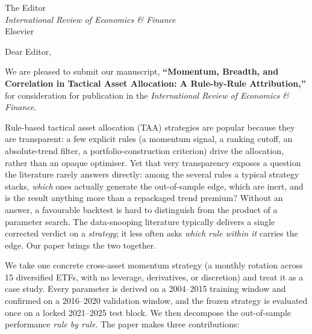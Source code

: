 \documentclass[11pt,a4paper]{letter}
\begin{document}
\begin{letter}{The Editor\\\textit{International Review of Economics \& Finance}\\Elsevier}

\opening{Dear Editor,}

\onehalfspacing

We are pleased to submit our manuscript, \textbf{``Momentum, Breadth, and
Correlation in Tactical Asset Allocation: A Rule-by-Rule Attribution,''} for
consideration for publication in the \textit{International Review of Economics \& Finance}.

Rule-based tactical asset allocation (TAA) strategies are popular because they are
transparent: a few explicit rules (a momentum signal, a ranking cutoff, an
absolute-trend filter, a portfolio-construction criterion) drive the allocation,
rather than an opaque optimiser. Yet that very transparency exposes a question the
literature rarely answers directly: among the several rules a typical strategy
stacks, \emph{which} ones actually generate the out-of-sample edge, which are
inert, and is the result anything more than a repackaged trend premium? Without an
answer, a favourable backtest is hard to distinguish from the product of a
parameter search. The data-snooping literature typically delivers a single
corrected verdict on a \emph{strategy}; it less often asks \emph{which rule within
it} carries the edge. Our paper brings the two together.

We take one concrete cross-asset momentum strategy (a monthly rotation across 15
diversified ETFs, with no leverage, derivatives, or discretion) and treat it as a
case study. Every parameter is derived on a 2004--2015 training window and confirmed
on a 2016--2020 validation window, and the frozen strategy is evaluated once on a
locked 2021--2025 test block. We then decompose the out-of-sample performance
\emph{rule by rule}. The paper makes three contributions:


\end{letter}
\end{document}
